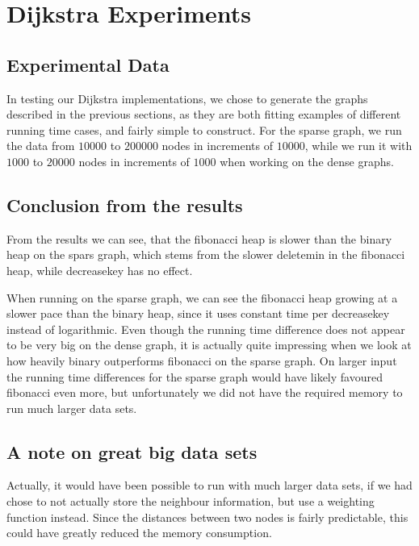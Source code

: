\section{Dijkstra Experiments}

\subsection{Experimental Data}

In testing our Dijkstra implementations, we chose to generate the graphs described in the previous sections, as they are both fitting examples of different running time cases, and fairly simple to construct.
For the sparse graph, we run the data from $10000$ to $200000$ nodes in increments of $10000$, while we run it with $1000$ to $20000$ nodes in increments of $1000$ when working on the dense graphs.


\subsection{Conclusion from the results}

From the results we can see, that the fibonacci heap is slower than the binary heap on the spars graph, which stems from the slower deletemin in the fibonacci heap, while decreasekey has no effect.

When running on the sparse graph, we can see the fibonacci heap growing at a slower pace than the binary heap, since it uses constant time per decreasekey instead of logarithmic.
Even though the running time difference does not appear to be very big on the dense graph, it is actually quite impressing when we look at how heavily binary outperforms fibonacci on the sparse graph. On larger input the running time differences for the sparse graph would have likely favoured fibonacci even more, but unfortunately we did not have the required memory to run much larger data sets.

\subsection{A note on great big data sets}

Actually, it would have been possible to run with much larger data sets, if we had chose to not actually store the neighbour information, but use a weighting function instead. Since the distances between two nodes is fairly predictable, this could have greatly reduced the memory consumption. 